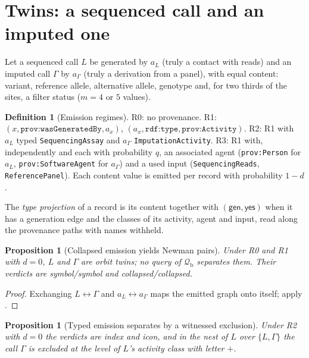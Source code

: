 \documentclass[11pt,twocolumn,a4paper]{article}
\theoremstyle{plain}
\newtheorem{proposition}[theorem]{Proposition}
\theoremstyle{definition}
\newtheorem{definition}[theorem]{Definition}
\theoremstyle{remark}
\newcommand{\Qfrag}{\mathcal{Q}_{\mathrm{b}}}
\newcommand{\vsym}{\textsf{symbol}}
\newcommand{\vcol}{\textsf{collapsed}}
\newcommand{\vind}{\textsf{index}}
\newcommand{\vico}{\textsf{icon}}
\newcommand{\genby}{\texttt{prov:wasGeneratedBy}}
\newcommand{\rdftype}{\texttt{rdf:type}}
\newcommand{\lp}{\mathtt{+}}
\begin{document}
\section{Twins: a sequenced call and an imputed one}
\label{sec:twins}

Let a sequenced call $L$ be generated by $a_L$ (truly a contact with reads) and
an imputed call $\Gamma$ by $a_\Gamma$ (truly a derivation from a panel), with
equal content: variant, reference allele, alternative allele, genotype and,
for two thirds of the sites, a filter status ($m=4$ or $5$ values).

\begin{definition}[Emission regimes]
\label{def:regimes}
R0: no provenance. R1: $(x,\genby,a_x)$, $(a_x,\rdftype,\texttt{prov:Activity})$.
R2: R1 with $a_L$ typed \texttt{SequencingAssay} and $a_\Gamma$
\texttt{ImputationActivity}. R3: R1 with, independently and each with
probability $q$, an associated agent (\texttt{prov:Person} for $a_L$,
\texttt{prov:SoftwareAgent} for $a_\Gamma$) and a used input
(\texttt{SequencingReads}, \texttt{ReferencePanel}). Each content value is
emitted per record with probability $1-d$.
\end{definition}

The \emph{type projection} of a record is its content together with
$(\textsf{gen},\textsf{yes})$ when it has a generation edge and the classes of
its activity, agent and input, read along the provenance paths with names
withheld.

\begin{proposition}[Collapsed emission yields Newman pairs]
\label{prop:r01}
Under R0 and R1 with $d=0$, $L$ and $\Gamma$ are orbit twins; no query of
$\Qfrag$ separates them. Their verdicts are \vsym/\vsym{} and \vcol/\vcol.
\end{proposition}

\begin{proof}
Exchanging $L\leftrightarrow\Gamma$ and $a_L\leftrightarrow a_\Gamma$ maps the
emitted graph onto itself; apply .
\end{proof}

\begin{proposition}[Typed emission separates by a witnessed exclusion]
\label{prop:r2}
Under R2 with $d=0$ the verdicts are \vind{} and \vico, and in the nest of $L$
over $\{L,\Gamma\}$ the call $\Gamma$ is excluded at the level of $L$'s activity
class with letter $\lp$.
\end{proposition}
\end{document}
